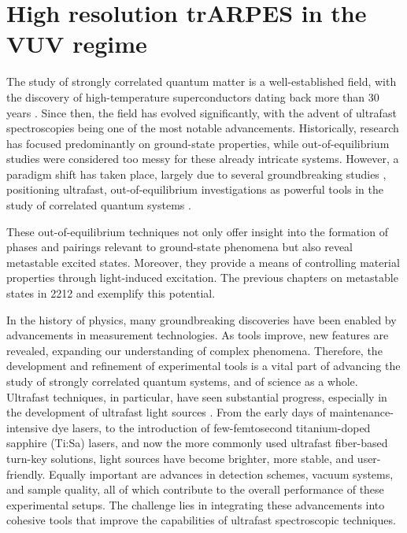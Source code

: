 \chapter{High resolution trARPES in the VUV regime}

The study of strongly correlated quantum matter is a well-established field, with the discovery of high-temperature superconductors dating back more than 30 years \cite{bednorz_possible_1986,anderson_resonating_1987}.
Since then, the field has evolved significantly, with the advent of ultrafast spectroscopies being one of the most notable advancements.
Historically, research has focused predominantly on ground-state properties, while out-of-equilibrium studies were considered too messy for these already intricate systems.
However, a paradigm shift has taken place, largely due to several groundbreaking studies \cite{eesley_relaxation_1990, han_femtosecond_1990, giannetti_revealing_2011, smallwood_tracking_2012}, positioning ultrafast, out-of-equilibrium investigations as powerful tools in the study of correlated quantum systems \cite{orenstein_ultrafast_2012, maiuri_ultrafast_2020, boschini_time-resolved_2024, giannetti_ultrafast_2016, lloyd-hughes_2021_2021}.

These out-of-equilibrium techniques not only offer insight into the formation of phases and pairings relevant to ground-state phenomena but also reveal metastable excited states.
Moreover, they provide a means of controlling material properties through light-induced excitation.
The previous chapters on metastable states in 2212 and  exemplify this potential.

In the history of physics, many groundbreaking discoveries have been enabled by advancements in measurement technologies.
As tools improve, new features are revealed, expanding our understanding of complex phenomena.
Therefore, the development and refinement of experimental tools is a vital part of advancing the study of strongly correlated quantum systems, and of science as a whole.
Ultrafast techniques, in particular, have seen substantial progress, especially in the development of ultrafast light sources \cite{keller_recent_2003}.
From the early days of maintenance-intensive dye lasers, to the introduction of few-femtosecond titanium-doped sapphire (Ti:Sa) lasers, and now the more commonly used ultrafast fiber-based turn-key solutions, light sources have become brighter, more stable, and user-friendly.
Equally important are advances in detection schemes, vacuum systems, and sample quality, all of which contribute to the overall performance of these experimental setups.
The challenge lies in integrating these advancements into cohesive tools that improve the capabilities of ultrafast spectroscopic techniques.


